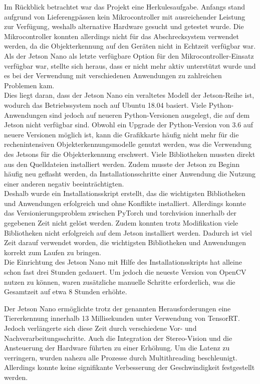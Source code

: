 
Im Rückblick betrachtet war das Projekt eine Herkulesaufgabe. Anfangs stand aufgrund von Lieferengpässen kein Mikrocontroller mit ausreichender Leistung zur Verfügung, weshalb alternative Hardware gesucht und getestet wurde. Die Mikrocontroller konnten allerdings nicht für das Abschrecksystem verwendet werden, da die Objekterkennung auf den Geräten nicht in Echtzeit verfügbar war.
\\
Als der Jetson Nano als letzte verfügbare Option für den Mikrocontroller-Einsatz verfügbar war, stellte sich heraus, dass er nicht mehr aktiv unterstützt wurde und es bei der Verwendung mit verschiedenen Anwendungen zu zahlreichen Problemen kam.
\\
Dies liegt daran, dass der Jetson Nano ein veraltetes Modell der Jetson-Reihe ist, wodurch das Betriebssystem noch auf Ubuntu 18.04 basiert. Viele Python-Anwendungen sind jedoch auf neueren Python-Versionen ausgelegt, die auf dem Jetson nicht verfügbar sind. Obwohl ein Upgrade der Python-Version von 3.6 auf neuere Versionen möglich ist, kann die Grafikkarte häufig nicht mehr für die rechenintensiven Objekterkennungsmodelle genutzt werden, was die Verwendung des Jetsons für die Objekterkennung erschwert. Viele Bibliotheken mussten direkt aus den Quelldateien installiert werden. Zudem musste der Jetson zu Beginn häufig neu geflasht werden, da Installationsschritte einer Anwendung die Nutzung einer anderen negativ beeinträchtigten.
\\
Deshalb wurde ein Installationsskript erstellt, das die wichtigsten Bibliotheken und Anwendungen erfolgreich und ohne Konflikte installiert. Allerdings konnte das Versionierungsproblem zwischen PyTorch und torchvision innerhalb der gegebenen Zeit nicht gelöst werden. Zudem konnten trotz Modifikation viele Bibliotheken nicht erfolgreich auf dem Jetson installiert werden. Dadurch ist viel Zeit darauf verwendet worden, die wichtigsten Bibliotheken und Anwendungen korrekt zum Laufen zu bringen.
\\
Die Einrichtung des Jetson Nano mit Hilfe des Installationsskripts hat alleine schon fast drei Stunden gedauert. Um jedoch die neueste Version von OpenCV nutzen zu können, waren zusätzliche manuelle Schritte erforderlich, was die Gesamtzeit auf etwa 8 Stunden erhöhte.

Der Jetson Nano ermöglichte trotz der genannten Herausforderungen eine Tiererkennung innerhalb 13 Millisekunden unter Verwendung von TensorRT. Jedoch verlängerte sich diese Zeit durch verschiedene Vor- und Nachverarbeitungsschritte. Auch die Integration der Stereo-Vision und die Ansteuerung der Hardware führten zu einer Erhöhung. Um die Latenz zu verringern, wurden nahezu alle Prozesse durch Multithreading beschleunigt. Allerdings konnte keine signifikante Verbesserung der Geschwindigkeit festgestellt werden.
